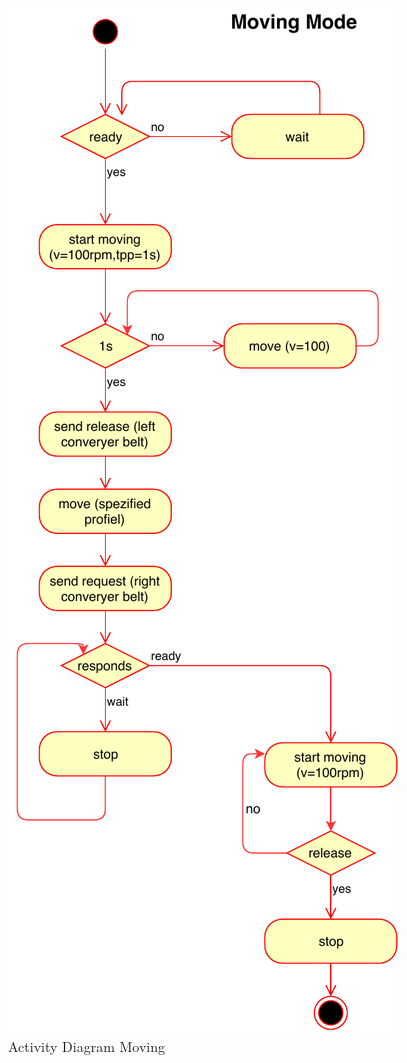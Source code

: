 \documentclass[a4paper,12pt,twoside]{scrreprt}
\begin{document}
\begin{figure}[H]
	\centering
	\includegraphics[width=\textwidth,height=\textheight,keepaspectratio]{activityDiagram/activitychartMovingState.pdf}
	\caption[Activity Diagram Moving]{Activity Diagram Moving}
	\label{fig:ActivityDiagramMoving}
\end{figure}
\end{document}
